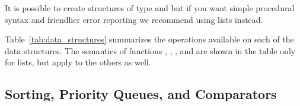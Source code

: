 It is possible to create structures of type  and
 but if you want simple procedural syntax and friendlier error reporting
we recommend using lists instead.

Table~\ref{tab:data_structures} summarizes the operations available on each
of the data structures.
The semantics of functions , , , and
 are shown in the table only for lists, but apply to the others as well.

\subsection{Sorting, Priority Queues, and Comparators} \label{sec:sorting}



